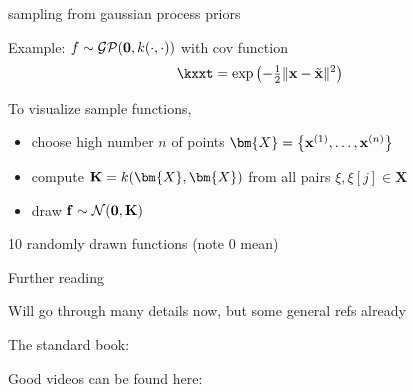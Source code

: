 \documentclass[11pt,compress,t,notes=noshow, xcolor=table]{beamer}
\begin{document}
\begin{framei}[sep=L]{sampling from gaussian process priors}
\item Example: $f \sim \mathcal{GP}(\mathbf{0}, k(\cdot, \cdot))$ with cov function
$$ \kxxt = \exp\left(-\tfrac{1}{2}\xxtnorm^2\right)$$
\item To visualize sample functions, 
\begin{itemize}
\item choose high number $n$ of points $\bm{X} = \xdat$
  \item compute $\Kmat = k(\bm{X}, \bm{X})$ from all pairs $\xi, \xi[j] \in \bm{X}$ 
  \item draw $\mathbf{f} \sim \mathcal{N}(\mathbf{0}, \mathbf{K})$ 
\end{itemize}
\item 10 randomly drawn functions (note 0 mean)
\vfill
{}
\end{framei}

\begin{framei}[sep=L]{Further reading}

\item Will go through many details now, but some general refs already

\item The standard book: 

\item Good videos can be found here:



\end{framei}
\endlecture
\end{document}
